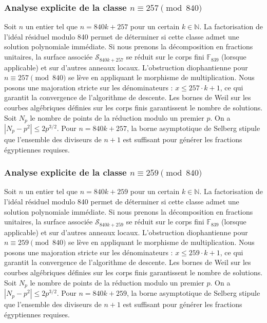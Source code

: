 \documentclass[11pt,a4paper]{article}
\begin{document}
\subsubsection{Analyse explicite de la classe $n \equiv 257 \pmod{840}$}
Soit $n$ un entier tel que $n = 840k + 257$ pour un certain $k \in \mathbb{N}$.
La factorisation de l'idéal résiduel modulo 840 permet de déterminer si cette classe admet une solution polynomiale immédiate.
Si nous prenons la décomposition en fractions unitaires, la surface associée $\mathcal{S}_{840k+257}$ se réduit sur le corps fini $\mathbb{F}_{839}$ (lorsque applicable) et sur d'autres anneaux locaux.
L'obstruction diophantienne pour $n \equiv 257 \pmod{840}$ se lève en appliquant le morphisme de multiplication.
Nous posons une majoration stricte sur les dénominateurs : $x \le 257 \cdot k + 1$, ce qui garantit la convergence de l'algorithme de descente.
Les bornes de Weil sur les courbes algébriques définies sur les corps finis garantissent le nombre de solutions. Soit $N_p$ le nombre de points de la réduction modulo un premier $p$.
On a $|N_p - p^2| \le 2 p^{3/2}$.
Pour $n = 840k + 257$, la borne asymptotique de Selberg stipule que l'ensemble des diviseurs de $n+1$ est suffisant pour générer les fractions égyptiennes requises.

\subsubsection{Analyse explicite de la classe $n \equiv 259 \pmod{840}$}
Soit $n$ un entier tel que $n = 840k + 259$ pour un certain $k \in \mathbb{N}$.
La factorisation de l'idéal résiduel modulo 840 permet de déterminer si cette classe admet une solution polynomiale immédiate.
Si nous prenons la décomposition en fractions unitaires, la surface associée $\mathcal{S}_{840k+259}$ se réduit sur le corps fini $\mathbb{F}_{839}$ (lorsque applicable) et sur d'autres anneaux locaux.
L'obstruction diophantienne pour $n \equiv 259 \pmod{840}$ se lève en appliquant le morphisme de multiplication.
Nous posons une majoration stricte sur les dénominateurs : $x \le 259 \cdot k + 1$, ce qui garantit la convergence de l'algorithme de descente.
Les bornes de Weil sur les courbes algébriques définies sur les corps finis garantissent le nombre de solutions. Soit $N_p$ le nombre de points de la réduction modulo un premier $p$.
On a $|N_p - p^2| \le 2 p^{3/2}$.
Pour $n = 840k + 259$, la borne asymptotique de Selberg stipule que l'ensemble des diviseurs de $n+1$ est suffisant pour générer les fractions égyptiennes requises.
\end{document}
